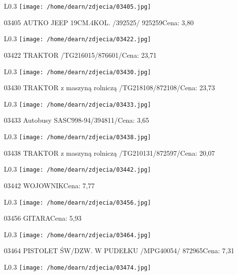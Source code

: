 \begin{wrapfigure}{L}{0.3\textwidth}
\texttt{[image: /home/dearn/zdjecia/03405.jpg]}
\end{wrapfigure}
03405 AUTKO JEEP 19CM.4KOL. /392525/                  925259Cena: 3,80\newline
\begin{wrapfigure}{L}{0.3\textwidth}
\texttt{[image: /home/dearn/zdjecia/03422.jpg]}
\end{wrapfigure}
03422 TRAKTOR /TG216015/876601/Cena: 23,71\newline
\begin{wrapfigure}{L}{0.3\textwidth}
\texttt{[image: /home/dearn/zdjecia/03430.jpg]}
\end{wrapfigure}
03430 TRAKTOR z maszyną rolniczą /TG218108/872108/Cena: 23,73\newline
\begin{wrapfigure}{L}{0.3\textwidth}
\texttt{[image: /home/dearn/zdjecia/03433.jpg]}
\end{wrapfigure}
03433 Autobusy SASC998-94/394811/Cena: 3,65\newline
\begin{wrapfigure}{L}{0.3\textwidth}
\texttt{[image: /home/dearn/zdjecia/03438.jpg]}
\end{wrapfigure}
03438 TRAKTOR z maszyną rolniczą /TG210131/872597/Cena: 20,07\newline
\begin{wrapfigure}{L}{0.3\textwidth}
\texttt{[image: /home/dearn/zdjecia/03442.jpg]}
\end{wrapfigure}
03442 WOJOWNIKCena: 7,77\newline
\begin{wrapfigure}{L}{0.3\textwidth}
\texttt{[image: /home/dearn/zdjecia/03456.jpg]}
\end{wrapfigure}
03456 GITARACena: 5,93\newline
\begin{wrapfigure}{L}{0.3\textwidth}
\texttt{[image: /home/dearn/zdjecia/03464.jpg]}
\end{wrapfigure}
03464 PISTOLET ŚW/DZW. W PUDEŁKU /MPG40054/           872965Cena: 7,31\newline
\begin{wrapfigure}{L}{0.3\textwidth}
\texttt{[image: /home/dearn/zdjecia/03474.jpg]}
\end{wrapfigure}
